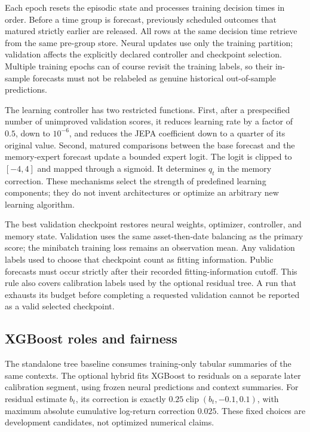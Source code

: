 \documentclass[11pt,a4paper]{article}
\newcommand{\clip}{\operatorname{clip}}
\begin{document}
Each epoch resets the episodic state and processes training decision times in order. Before a time group is forecast, previously scheduled outcomes that matured strictly earlier are released. All rows at the same decision time retrieve from the same pre-group store. Neural updates use only the training partition; validation affects the explicitly declared controller and checkpoint selection. Multiple training epochs can of course revisit the training labels, so their in-sample forecasts must not be relabeled as genuine historical out-of-sample predictions.

The learning controller has two restricted functions. First, after a prespecified number of unimproved validation scores, it reduces learning rate by a factor of $0.5$, down to $10^{-6}$, and reduces the JEPA coefficient down to a quarter of its original value. Second, matured comparisons between the base forecast and the memory-expert forecast update a bounded expert logit. The logit is clipped to $[-4,4]$ and mapped through a sigmoid. It determines $q_t$ in the memory correction. These mechanisms select the strength of predefined learning components; they do not invent architectures or optimize an arbitrary new learning algorithm.

The best validation checkpoint restores neural weights, optimizer, controller, and memory state. Validation uses the same asset-then-date balancing as the primary score; the minibatch training loss remains an observation mean. Any validation labels used to choose that checkpoint count as fitting information. Public forecasts must occur strictly after their recorded fitting-information cutoff. This rule also covers calibration labels used by the optional residual tree. A run that exhausts its budget before completing a requested validation cannot be reported as a valid selected checkpoint.

\subsection{XGBoost roles and fairness}

The standalone tree baseline consumes training-only tabular summaries of the same contexts. The optional hybrid fits XGBoost to residuals on a separate later calibration segment, using frozen neural predictions and context summaries. For residual estimate $b_t$, its correction is exactly $0.25\clip(b_t,-0.1,0.1)$, with maximum absolute cumulative log-return correction $0.025$. These fixed choices are development candidates, not optimized numerical claims.
\end{document}
